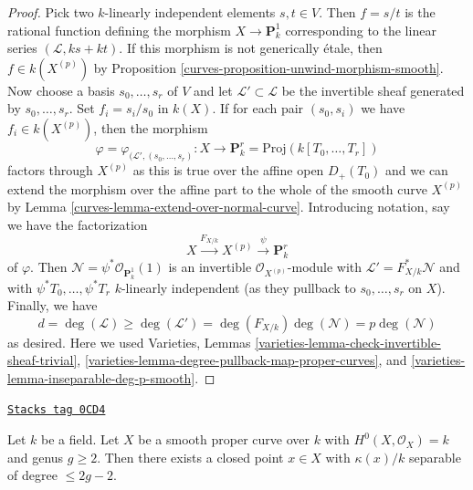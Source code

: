 \begin{proof}

Pick two $k$-linearly independent elements $s, t \in V$.
Then $f = s/t$ is the rational function defining the morphism
$X \to \mathbf{P}^1_k$ corresponding to the linear series
$(\mathcal{L}, ks + kt)$. If this morphism is not
generically \'etale, then $f \in k(X^{(p)})$ by
Proposition \ref{curves-proposition-unwind-morphism-smooth}.
Now choose a basis $s_0, \ldots, s_r$ of $V$ and let
$\mathcal{L}' \subset \mathcal{L}$ be the invertible sheaf
generated by $s_0, \ldots, s_r$. Set $f_i = s_i/s_0$ in $k(X)$.
If for each pair $(s_0, s_i)$ we have $f_i \in k(X^{(p)})$, then
the morphism
$$
\varphi = \varphi_{(\mathcal{L}', (s_0, \ldots, s_r)} :
X
\longrightarrow
\mathbf{P}^r_k = \text{Proj}(k[T_0, \ldots, T_r])
$$
factors through $X^{(p)}$ as this is true over the affine open
$D_+(T_0)$ and we can extend the morphism over the affine part
to the whole of the smooth curve $X^{(p)}$ by
Lemma \ref{curves-lemma-extend-over-normal-curve}.
Introducing notation, say we have the factorization
$$
X \xrightarrow{F_{X/k}} X^{(p)} \xrightarrow{\psi} \mathbf{P}^r_k
$$
of $\varphi$. Then $\mathcal{N} = \psi^*\mathcal{O}_{\mathbf{P}^1_k}(1)$
is an invertible $\mathcal{O}_{X^{(p)}}$-module with
$\mathcal{L}' = F_{X/k}^*\mathcal{N}$ and with
$\psi^*T_0, \ldots, \psi^*T_r$ $k$-linearly independent
(as they pullback to $s_0, \ldots, s_r$ on $X$).
Finally, we have
$$
d = \deg(\mathcal{L}) \geq \deg(\mathcal{L}') =
\deg(F_{X/k}) \deg(\mathcal{N}) = p \deg(\mathcal{N})
$$
as desired. Here we used Varieties, Lemmas
\ref{varieties-lemma-check-invertible-sheaf-trivial},
\ref{varieties-lemma-degree-pullback-map-proper-curves}, and
\ref{varieties-lemma-inseparable-deg-p-smooth}.
\end{proof}

\begin{lemma}
\label{curves-lemma-point-over-separable-extension}
\href{https://stacks.math.columbia.edu/tag/0CD4}{\texttt{Stacks tag 0CD4}}

Let $k$ be a field. Let $X$ be a smooth proper curve over $k$
with $H^0(X, \mathcal{O}_X) = k$ and genus $g \geq 2$.
Then there exists a closed point $x \in X$ with
$\kappa(x)/k$ separable of degree $\leq 2g - 2$.
\end{lemma}

